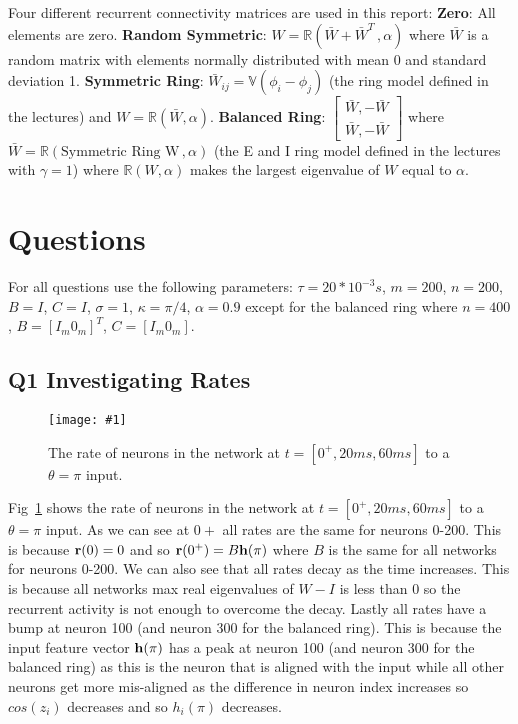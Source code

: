 \documentclass[a4paper, 11pt, oneside]{report}
\newcommand{\centreImage}[2]{
	\begin{figure}[H]
		\centering
		\texttt{[image: \#1]}
		\caption{#2}
        \label{fig:#1}
	\end{figure}
}
\begin{document}
Four different recurrent connectivity matrices are used in this report: \textbf{Zero}: All elements are zero.
\textbf{Random Symmetric}: $W = \mathbb{R}(\bar{W}+\bar{W}^T\,,\alpha)$ where $\bar{W}$ is a random matrix with elements normally distributed with mean 0 and standard deviation 1.
\textbf{Symmetric Ring}: $\bar{W}_{ij} = \mathbb{V}(\phi_i-\phi_j)$ (the ring model defined in the lectures) and $W = \mathbb{R}(\bar{W},\alpha)$.
\textbf{Balanced Ring}: $\begin{bmatrix}
        \bar{W}, -\bar{W} \\
        \bar{W}, -\bar{W}
    \end{bmatrix}$ where $\bar{W} = \mathbb{R}(\text{Symmetric Ring W}\,,\alpha)$ (the E and I ring model defined in the lectures with $\gamma=1$)
where $\mathbb{R}(W,\alpha)$ makes the largest eigenvalue of $W$ equal to $\alpha$.

\section*{Questions}

For all questions use the following parameters:
$\tau = 20*10^{-3}s$, $m=200$, $n=200$, $B=I$, $C=I$, $\sigma=1$, $\kappa=\pi/4$, $\alpha=0.9$
except for the balanced ring where $n=400$, $B=[I_m 0_m]^T$, $C=[I_m 0_m]$.

\subsection*{Q1 Investigating Rates}

\centreImage{rate_of_neurons.png}{The rate of neurons in the network at $t=[0^+, 20ms, 60ms]$ to a $\theta=\pi$ input.}

Fig~\ref{fig:rate_of_neurons.png} shows the rate of neurons in the network at $t=[0^+, 20ms, 60ms]$
to a $\theta=\pi$ input.
As we can see at $0+$ all rates are the same for neurons 0-200. This is because $\mathbf{r}(0)=0$ and
so $\mathbf{r}(0^+)=B\mathbf{h}(\pi)$ where $B$ is the same for all networks for neurons 0-200. We can also
see that all rates decay as the time increases. This is because all networks max real eigenvalues of $W-I$
is less than 0 so the recurrent activity is not enough to overcome the decay. Lastly
all rates have a bump at neuron 100 (and neuron 300 for the balanced ring).
This is because the input feature vector $\mathbf{h}(\pi)$ has a peak at neuron 100 (and neuron 300 for the balanced ring)
as this is the neuron that is aligned with the input while all other neurons get more mis-aligned as the difference
in neuron index increases so $cos(z_i)$ decreases and so $h_i(\pi)$ decreases.
\end{document}
